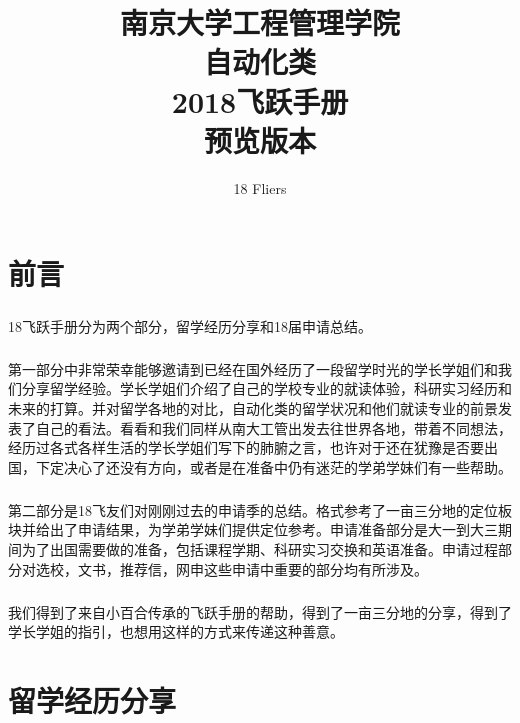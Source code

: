\documentclass[a4paper,UTF8]{book}
\begin{document}
\title{南京大学工程管理学院\\自动化类\\2018飞跃手册\\预览版本}
\author{18 Fliers}
\maketitle %

\tableofcontents %

\chapter{前言}
\begin{spacing}{1.5}
\paragraph[indent=0pt]{}18飞跃手册分为两个部分，留学经历分享和18届申请总结。
\paragraph{}第一部分中非常荣幸能够邀请到已经在国外经历了一段留学时光的学长学姐们和我们分享留学经验。学长学姐们介绍了自己的学校专业的就读体验，科研实习经历和未来的打算。并对留学各地的对比，自动化类的留学状况和他们就读专业的前景发表了自己的看法。看看和我们同样从南大工管出发去往世界各地，带着不同想法，经历过各式各样生活的学长学姐们写下的肺腑之言，也许对于还在犹豫是否要出国，下定决心了还没有方向，或者是在准备中仍有迷茫的学弟学妹们有一些帮助。
\paragraph{}第二部分是18飞友们对刚刚过去的申请季的总结。格式参考了一亩三分地的定位板块并给出了申请结果，为学弟学妹们提供定位参考。申请准备部分是大一到大三期间为了出国需要做的准备，包括课程学期、科研实习交换和英语准备。申请过程部分对选校，文书，推荐信，网申这些申请中重要的部分均有所涉及。
\paragraph{}我们得到了来自小百合传承的飞跃手册的帮助，得到了一亩三分地的分享，得到了学长学姐的指引，也想用这样的方式来传递这种善意。
\end{spacing}

\clearpage

\chapter{留学经历分享}  %
\clearpage
\end{document}

